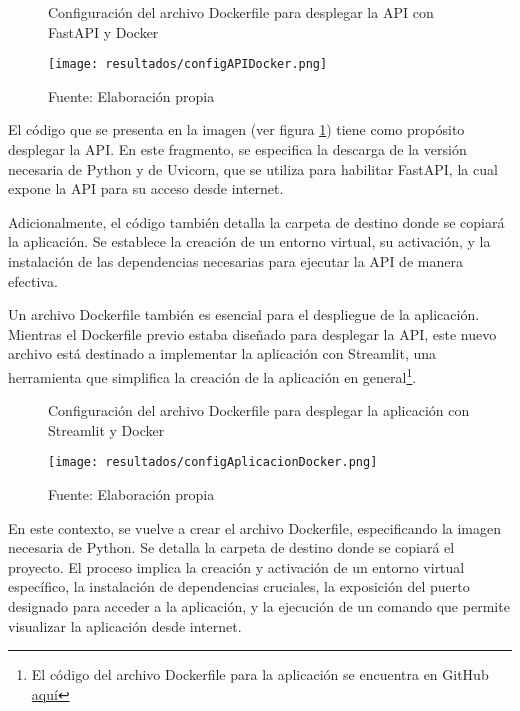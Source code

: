 \begin{figure}[h]
	\centering
	\caption{Configuración del archivo Dockerfile para desplegar la API con FastAPI y Docker}
	\texttt{[image: resultados/configAPIDocker.png]}
	\caption*{\footnotesize Fuente: Elaboración propia}
	\label{fig:figuraConfigAPIDocker}
\end{figure}

El código que se presenta en la imagen (ver figura \ref{fig:figuraConfigAPIDocker}) tiene como propósito desplegar la API. En este fragmento, se especifica la descarga de la versión necesaria de Python y de Uvicorn, que se utiliza para habilitar FastAPI, la cual expone la API para su acceso desde internet.

Adicionalmente, el código también detalla la carpeta de destino donde se copiará la aplicación. Se establece la creación de un entorno virtual, su activación, y la instalación de las dependencias necesarias para ejecutar la API de manera efectiva. \newline

Un archivo Dockerfile también es esencial para el despliegue de la aplicación. Mientras el Dockerfile previo estaba diseñado para desplegar la API, este nuevo archivo está destinado a implementar la aplicación con Streamlit, una herramienta que simplifica la creación de la aplicación en general\footnote{El código del archivo Dockerfile para la aplicación se encuentra en GitHub \href{https://github.com/juferoto/mlops_project/tree/master/application/src/webapp}{aquí}}.

\newpage

\begin{figure}[h]
	\centering
	\caption{Configuración del archivo Dockerfile para desplegar la aplicación con Streamlit y Docker}
	\texttt{[image: resultados/configAplicacionDocker.png]}
	\caption*{\footnotesize Fuente: Elaboración propia}
	\label{fig:figuraConfigAplicacionDocker}
\end{figure}

En este contexto, se vuelve a crear el archivo Dockerfile, especificando la imagen necesaria de Python. Se detalla la carpeta de destino donde se copiará el proyecto. El proceso implica la creación y activación de un entorno virtual específico, la instalación de dependencias cruciales, la exposición del puerto designado para acceder a la aplicación, y la ejecución de un comando que permite visualizar la aplicación desde internet. \newline


